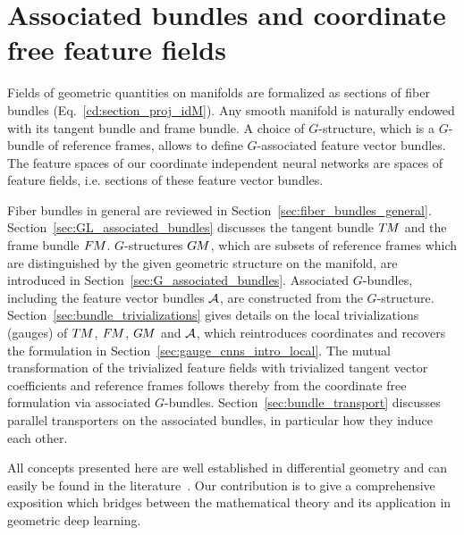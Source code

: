 

\section{Associated bundles and coordinate free feature fields}
\label{sec:bundles_fields}

Fields of geometric quantities on manifolds are formalized as sections of fiber bundles (Eq.~\eqref{cd:section_proj_idM}).
Any smooth manifold is naturally endowed with its tangent bundle and frame bundle.
A choice of $G$-structure, which is a $G$-bundle of reference frames, allows to define $G$-associated feature vector bundles.
The feature spaces of our coordinate independent neural networks are spaces of feature fields, i.e. sections of these feature vector bundles.

Fiber bundles in general are reviewed in Section~\ref{sec:fiber_bundles_general}.
Section~\ref{sec:GL_associated_bundles} discusses the tangent bundle $T\mkern-1.5muM$ and the frame bundle $F\mkern-1.5muM$.
$G$-structures $G\mkern-1.4muM$, which are subsets of reference frames which are distinguished by the given geometric structure on the manifold, are introduced in Section~\ref{sec:G_associated_bundles}.
Associated $G$-bundles, including the feature vector bundles $\mathcal{A}$, are constructed from the $G$-structure.
Section~\ref{sec:bundle_trivializations} gives details on the local trivializations (gauges) of $T\mkern-1.5muM$, $F\mkern-1.5muM$, $G\mkern-1.4muM$ and $\mathcal{A}$, which reintroduces coordinates and recovers the formulation in Section~\ref{sec:gauge_cnns_intro_local}.
The mutual transformation of the trivialized feature fields with trivialized tangent vector coefficients and reference frames follows thereby from the coordinate free formulation via associated $G$-bundles.
Section~\ref{sec:bundle_transport} discusses parallel transporters on the associated bundles, in particular how they induce each other.


All concepts presented here are well established in differential geometry and can easily be found in the literature~\cite{schullerGeometricalAnatomy2016,nakahara2003geometry,husemollerFibreBundles1994a,steenrodTopologyFibreBundles,shoshichikobayashiFoundationsDifferentialGeometry1963,marshGaugeTheoriesFiber2016,wendlLectureNotesBundles2008,sternberg1999lectures,piccione2006theory,crainic2013GStructuresExamples}.
Our contribution is to give a comprehensive exposition which bridges between the mathematical theory and its application in geometric deep learning.
